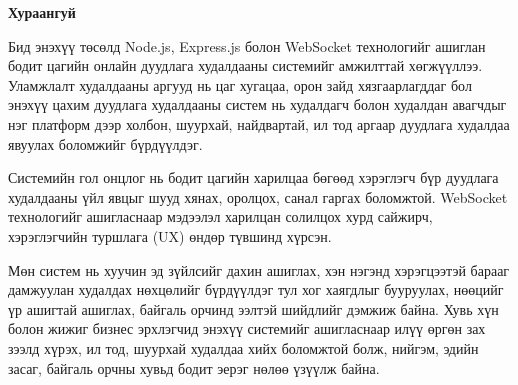 

\begin{center}
{\scshape\Large \univname\par} %
{\scshape\large \facname\par}\vspace{0.5cm} %
{\huge\textbf{{Хураангуй}} \par}
\bigskip
{\Large{\ttitle} \par} %
\bigskip

{\normalsize \shortname \par} %
\addressname
\end{center}

\bigskip

Бид энэхүү төсөлд Node.js, Express.js болон WebSocket технологийг ашиглан бодит цагийн онлайн дуудлага худалдааны системийг амжилттай хөгжүүллээ. Уламжлалт худалдааны аргууд нь цаг хугацаа, орон зайд хязгаарлагддаг бол энэхүү цахим дуудлага худалдааны систем нь худалдагч болон худалдан авагчдыг нэг платформ дээр холбон, шуурхай, найдвартай, ил тод аргаар дуудлага худалдаа явуулах боломжийг бүрдүүлдэг.

Системийн гол онцлог нь бодит цагийн харилцаа бөгөөд хэрэглэгч бүр дуудлага худалдааны үйл явцыг шууд хянах, оролцох, санал гаргах боломжтой. WebSocket технологийг ашигласнаар мэдээлэл харилцан солилцох хурд сайжирч, хэрэглэгчийн туршлага (UX) өндөр түвшинд хүрсэн.

Мөн систем нь хуучин эд зүйлсийг дахин ашиглах, хэн нэгэнд хэрэгцээтэй барааг дамжуулан худалдах нөхцөлийг бүрдүүлдэг тул хог хаягдлыг бууруулах, нөөцийг үр ашигтай ашиглах, байгаль орчинд ээлтэй шийдлийг дэмжиж байна. Хувь хүн болон жижиг бизнес эрхлэгчид энэхүү системийг ашигласнаар илүү өргөн зах зээлд хүрэх, ил тод, шуурхай худалдаа хийх боломжтой болж, нийгэм, эдийн засаг, байгаль орчны хувьд бодит эерэг нөлөө үзүүлж байна.






